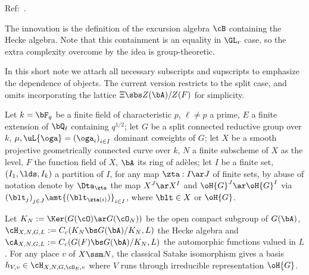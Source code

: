 \documentclass[a4paper, twoside]{article}
\begin{document}
\confighead{}{}{}


Ref:~\cite{Lafforgue2018Chtoucas}.

The innovation is the definition of the excursion algebra $\cB$ containing the Hecke algebra. Note that this containment is an equality in $\GL_{r}$ case, so the extra complexity overcome by the idea is group-theoretic.

In this short note we attach all necessary subscripts and supscripts to emphasize the dependence of objects. The current version restricts to the split case, and omits incorporating the lattice $\Xi\sbs Z(\bA)/Z(F)$ for simplicity.


\begin{stp}
	Let $k=\bF_{q}$ be a finite field of characteristic $p$, $\ell\neq p$ a prime, $E$ a finite extension of $\bQ_{\ell}$ containing $q^{1/2}$; let $G$ be a split connected reductive group over $k$, $\mu,\uL{\oga}={(\oga_{i})}_{i\in I}$ dominant coweights of $G$; let $X$ be a smooth projective geometrically connected curve over $k$, $N$ a finite subscheme of $X$ as the level, $F$ the function field of $X$, $\bA$ its ring of ad{\`e}les; let $I$ be a finite set, $(I_{1},\lds,I_{k})$ a partition of $I$, for any map $\zta:I\ar J$ of finite sets, by abuse of notation denote by $\Dta_{\zta}$ the map $X^{J}\ar X^{I}$ and $\oH{G}^{J}\ar\oH{G}^{I}$ via ${(\blt_{j})}_{j\in J}\amt{(\blt_{\zta(i)})}_{i\in I}$, where $\blt\in X$ or $\oH{G}$.

	Let $K_{N}:=\Ker(G(\cO)\ar G(\cO_{N}))$ be the open compact subgroup of $G(\bA)$, $\cH_{X,N,G,L}:=C_{c}(K_{N}\bs G(\bA)/K_{N},L)$ the Hecke algebra and $\cA_{X,N,G,L}:=C_{c}(G(F)\bs G(\bA)/K_{N},L)$ the automorphic functions valued in $L$. For any place $v$ of $X\ssm N$, the classical Satake isomorphism gives a basis $h_{V,v}\in\cH_{X,N,G,\cO_{E},v}$ where $V$ runs through irreducible representation $\oH{G}$.


\end{stp}
\end{document}
